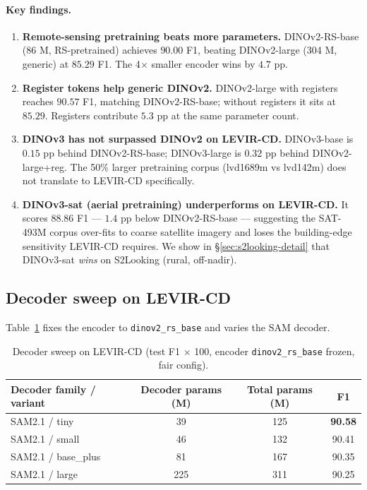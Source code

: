 \paragraph{Key findings.}
\begin{enumerate}
  \item \textbf{Remote-sensing pretraining beats more parameters.}
    DINOv2-RS-base (86 M, RS-pretrained) achieves $90.00$ F1, beating
    DINOv2-large (304 M, generic) at $85.29$ F1. The 4$\times$ smaller
    encoder wins by $4.7$ pp.
  \item \textbf{Register tokens help generic DINOv2.} DINOv2-large with
    registers reaches $90.57$ F1, matching DINOv2-RS-base; without
    registers it sits at $85.29$. Registers contribute $5.3$ pp at the
    same parameter count.
  \item \textbf{DINOv3 has not surpassed DINOv2 on LEVIR-CD.} DINOv3-base
    is $0.15$ pp behind DINOv2-RS-base; DINOv3-large is $0.32$ pp behind
    DINOv2-large+reg. The 50\% larger pretraining corpus (lvd1689m vs
    lvd142m) does not translate to LEVIR-CD specifically.
  \item \textbf{DINOv3-sat (aerial pretraining) underperforms on
    LEVIR-CD.} It scores $88.86$ F1 --- $1.4$ pp below DINOv2-RS-base ---
    suggesting the SAT-493M corpus over-fits to coarse satellite imagery
    and loses the building-edge sensitivity LEVIR-CD requires. We show in
    \S\ref{sec:s2looking-detail} that DINOv3-sat \emph{wins} on
    S2Looking (rural, off-nadir).
\end{enumerate}

\subsection{Decoder sweep on LEVIR-CD}
\label{sec:dec-sweep}

Table~\ref{tab:dec-sweep} fixes the encoder to \texttt{dinov2\_rs\_base}
and varies the SAM decoder.

\begin{table}[t]
  \centering
  \small
  \caption{Decoder sweep on LEVIR-CD (test F1 $\times$ 100, encoder
    \texttt{dinov2\_rs\_base} frozen, fair config).}
  \label{tab:dec-sweep}
  \begin{tabular}{lccc}
    \toprule
    Decoder family / variant & Decoder params (M) & Total params (M) & F1 \\
    \midrule
    SAM2.1 / tiny          & 39  & 125 & \textbf{90.58} \\
    SAM2.1 / small         & 46  & 132 & 90.41 \\
    SAM2.1 / base\_plus    & 81  & 167 & 90.35 \\
    SAM2.1 / large         & 225 & 311 & 90.25 \\
    \bottomrule
  \end{tabular}
\end{table}

